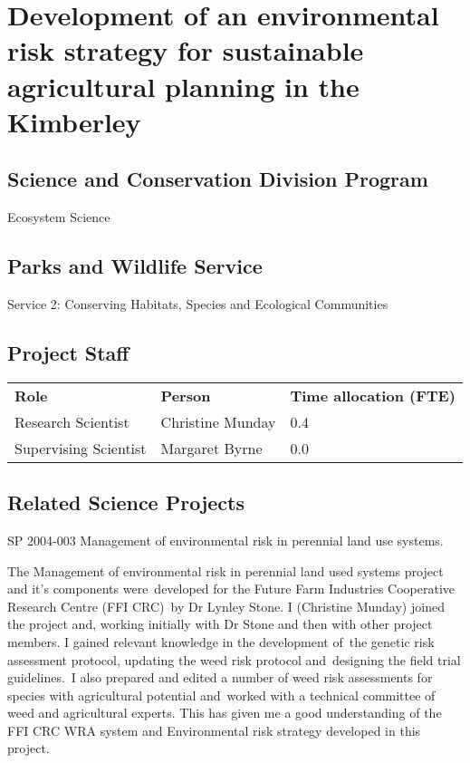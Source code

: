 \documentclass[version=last,
    paper=a4, %
    10pt, %
    usenames,
    dvipsnames,
    oneside, %
    headings=openany, %
    DIV=15 %
]{scrbook}
\begin{document}
\frontmatter
\maketitle
\mainmatter



\section*{Development of an environmental risk strategy for sustainable
agricultural planning in the Kimberley
}


\subsection*{Science and Conservation Division Program}
Ecosystem Science



\subsection*{Parks and Wildlife Service}
Service 2: Conserving Habitats, Species and Ecological Communities


\subsection*{Project Staff}
\begin{tabu} {X X X}
\textbf{Role} & \textbf{Person} & \textbf{Time allocation (FTE)}\\

Research Scientist & Christine  Munday & 0.4\\

Supervising Scientist & Margaret  Byrne & 0.0\\

\end{tabu}



\subsection*{Related Science Projects}
SP 2004-003 Management of environmental risk in perennial land use
systems.

The Management of environmental risk in perennial land used systems
project and it's components were~developed for the Future Farm
Industries Cooperative Research Centre (FFI CRC)~by Dr Lynley Stone. I
(Christine Munday) joined the project and, working initially with Dr
Stone and then with other project members. I gained relevant knowledge
in the development of~the genetic risk assessment protocol, updating the
weed risk protocol and~designing the field trial guidelines.~I also
prepared and edited a number of weed risk assessments for species with
agricultural potential and~worked with a technical committee of weed and
agricultural experts. This has given me a good understanding of the FFI
CRC WRA system and Environmental risk strategy developed in this
project.
\end{document}
